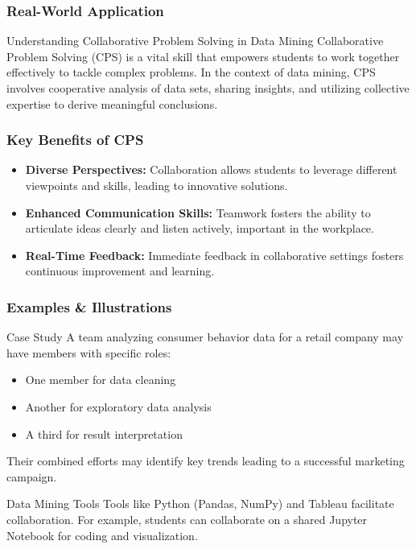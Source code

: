 \documentclass{beamer}
\begin{document}
\begin{frame}[fragile]
    \frametitle{Real-World Application}
    \begin{block}{Understanding Collaborative Problem Solving in Data Mining}
        Collaborative Problem Solving (CPS) is a vital skill that empowers students to work together effectively to tackle complex problems. 
        In the context of data mining, CPS involves cooperative analysis of data sets, sharing insights, and utilizing collective expertise to derive meaningful conclusions.
    \end{block}
\end{frame}

\begin{frame}[fragile]
    \frametitle{Key Benefits of CPS}
    \begin{itemize}
        \item \textbf{Diverse Perspectives:} 
        Collaboration allows students to leverage different viewpoints and skills, leading to innovative solutions.
        
        \item \textbf{Enhanced Communication Skills:} 
        Teamwork fosters the ability to articulate ideas clearly and listen actively, important in the workplace.
        
        \item \textbf{Real-Time Feedback:} 
        Immediate feedback in collaborative settings fosters continuous improvement and learning.
    \end{itemize}
\end{frame}

\begin{frame}[fragile]
    \frametitle{Examples & Illustrations}
    \begin{block}{Case Study}
        A team analyzing consumer behavior data for a retail company may have members with specific roles:
        \begin{itemize}
            \item One member for data cleaning
            \item Another for exploratory data analysis
            \item A third for result interpretation
        \end{itemize}
        Their combined efforts may identify key trends leading to a successful marketing campaign.
    \end{block}

    \begin{block}{Data Mining Tools}
        Tools like Python (Pandas, NumPy) and Tableau facilitate collaboration. 
        For example, students can collaborate on a shared Jupyter Notebook for coding and visualization.
    \end{block}
\end{frame}
\end{document}
